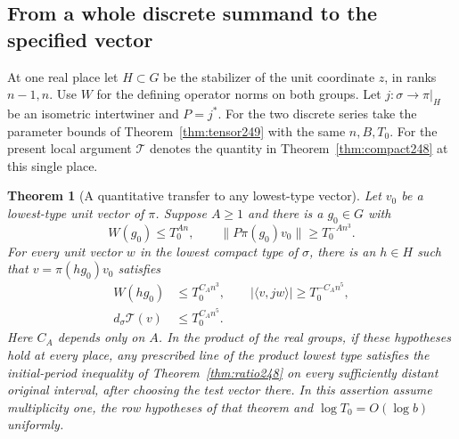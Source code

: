 \documentclass[a4paper,11pt]{article}
\newtheorem{theorem}[proposition]{Theorem}
\theoremstyle{definition}
\theoremstyle{remark}
\numberwithin{equation}{section}
\begin{document}
\subsection{From a whole discrete summand to the specified vector}\label{nav:IV-31}
At one real place let \(H\subset G\) be the stabilizer of the unit
coordinate \(z\), in ranks \(n-1,n\). Use \(W\) for the defining
operator norms on both groups. Let \(j:\sigma\to\pi|_H\) be an
isometric intertwiner and \(P=j^*\). For the two discrete series take
the parameter bounds of Theorem~\ref{thm:tensor249} with the same
\(n,B,T_0\). For the present local argument \(\mathcal T\) denotes
the quantity in Theorem~\ref{thm:compact248} at this single place.

\begin{theorem}[A quantitative transfer to any lowest-type vector]
\label{thm:direction249}
Let \(v_0\) be a lowest-type unit vector of \(\pi\). Suppose \(A\ge1\)
and there is a \(g_0\in G\) with
\[
      W(g_0)\le T_0^{A n},\qquad
          \|P\pi(g_0)v_0\|\ge T_0^{-A n^3} .
\]
For every unit vector \(w\) in the lowest compact type of \(\sigma\),
there is an \(h\in H\) such that \(v=\pi(hg_0)v_0\) satisfies
\[
 \begin{split}
 W(hg_0)&\le T_0^{C_A n^3},\qquad
          |\langle v,jw\rangle|\ge T_0^{-C_A n^5},\\
 d_\sigma\mathcal T(v)&\le T_0^{C_A n^5} .
 \end{split}
\]
Here \(C_A\) depends only on \(A\). In the product of the real groups,
if these hypotheses hold at every place, any prescribed line of the
product lowest type satisfies the initial-period inequality of
Theorem~\ref{thm:ratio248} on every sufficiently distant original
interval, after choosing the test vector there. In this assertion
assume multiplicity one, the row hypotheses of that theorem and
\(\log T_0=O(\log b)\) uniformly.
\end{theorem}
\end{document}
